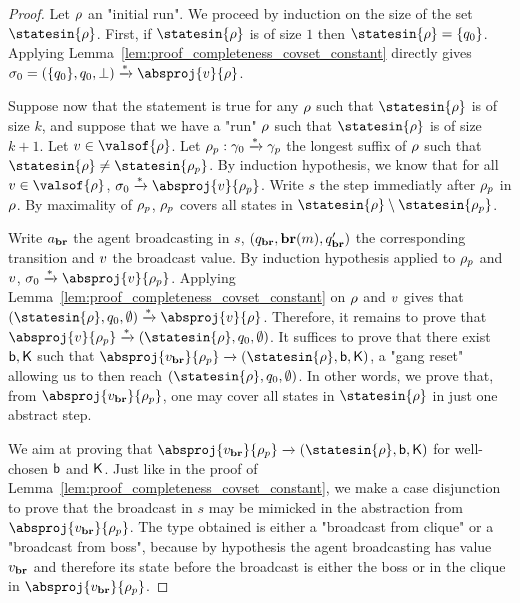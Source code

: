 \begin{proof}
	Let $\rho$ an "initial run".
	We proceed by induction on the size of the set $\statesin{\run}$. 
	First, if $\statesin{\run}$ is of size $1$ then $\statesin{\run} = \set{q_0}$. Applying Lemma~\ref{lem:proof_completeness_covset_constant} directly gives $\aconfiginit = (\set{q_0}, q_0, \noboss) \step{*} \absproj{\aval}{\run}$.
	
	
	Suppose now that the statement is true for any $\rho$ such that $\statesin{\run}$ is of size $k$, and suppose that we have a "run" $\rho$ such that $\statesin{\run}$ is of size $k+1$. Let $\aval \in \valsof{\run}$. Let $\rho_p: \gamma_0 \xrightarrow{*}\gamma_p$ the longest suffix of $\rho$ such that $\statesin{\run} \ne \statesin{\run_p}$. By induction hypothesis, we know that for all $\aval \in \valsof{\run}$, $\aconfiginit \step{*} \absproj{\aval}{\run_p}$. Write $s$ the step immediatly after $\rho_p$ in $\rho$. By maximality of $\rho_p$, $\rho_p$ covers all states in $\statesin{\run} \setminus \statesin{\run_p}$. 
	
	Write $a_{\textbf{br}}$ the agent broadcasting in $s$, $(q_{\textbf{br}}, \textbf{br}(m), q_{\textbf{br}}')$ the corresponding transition and $v$ the broadcast value. By induction hypothesis applied to $\rho_p$ and $v$, $\aconfiginit \step{*} \absproj{\aval}{\run_p}$. Applying Lemma~\ref{lem:proof_completeness_covset_constant} on $\rho$ and $v$ gives that $(\statesin{\run}, q_0, \emptyset) \step{*} \absproj{\aval}{\run}$. Therefore, it remains to prove that $\absproj{\aval}{\run_p} \step{*} (\statesin{\run}, q_0, \emptyset)$. It suffices to prove that there exist $\mathsf{b}, \mathsf{K}$ such that $\absproj{\avalbr}{\run_p} \step{} (\statesin{\run}, \boss,\clique)$, a "gang reset" allowing us to then reach $(\statesin{\run}, q_0, \emptyset)$. In other words, we prove that, from $\absproj{\avalbr}{\run_p}$, one may cover all states in $\statesin{\run}$ in just one abstract step.
	
	We aim at proving that $\absproj{\avalbr}{\run_p} \step{} (\statesin{\run}, \boss,\clique)$ for well-chosen $\mathsf{b}$ and $\mathsf{K}$.
	Just like in the proof of Lemma~\ref{lem:proof_completeness_covset_constant}, we make a case disjunction to prove that the broadcast in $s$ may be mimicked in the abstraction from $\absproj{\avalbr}{\run_p}$. The type obtained is either a "broadcast from clique" or a "broadcast from boss", because by hypothesis the agent broadcasting has value $v_{\textbf{br}}$ and therefore its state before the broadcast is either the boss or in the clique in $\absproj{\avalbr}{\run_p}$. 
	

\end{proof}
